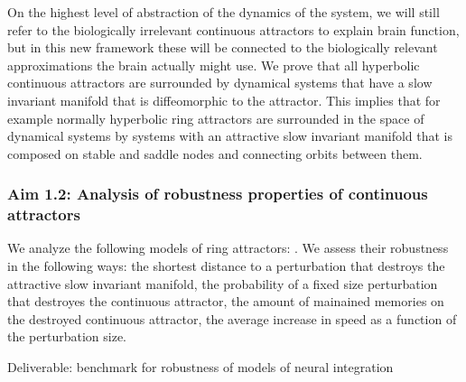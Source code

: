 \documentclass[12pt,letterpaper, onecolumn]{article}
\theoremstyle{definition}
\theoremstyle{remark}
\begin{document}
On the highest level of abstraction of the dynamics of the system, we will still refer to the biologically irrelevant continuous attractors to explain brain function, but in this new framework these will be connected to the biologically relevant approximations the brain actually might use.
We prove that all hyperbolic continuous attractors are surrounded by dynamical systems that have a slow invariant manifold that is diffeomorphic to the attractor. This implies that for example normally hyperbolic ring attractors are surrounded in the space of dynamical systems by systems with an attractive slow invariant manifold that is composed on stable and saddle nodes and connecting orbits between them.




%



\subsubsection*{Aim 1.2: Analysis of robustness properties of continuous attractors}
 We analyze the following models of ring attractors: \citep{pollock2020, barak2021mapping, beiran2021, noorman2022}.
We assess their robustness in the following ways:
the shortest distance to a perturbation that destroys the attractive slow invariant manifold,
the probability of a fixed size perturbation that destroyes the continuous attractor,
the amount of mainained memories on the destroyed continuous attractor,
the average increase in speed as a function of the perturbation size.





Deliverable: benchmark for robustness of models of neural integration
\end{document}
